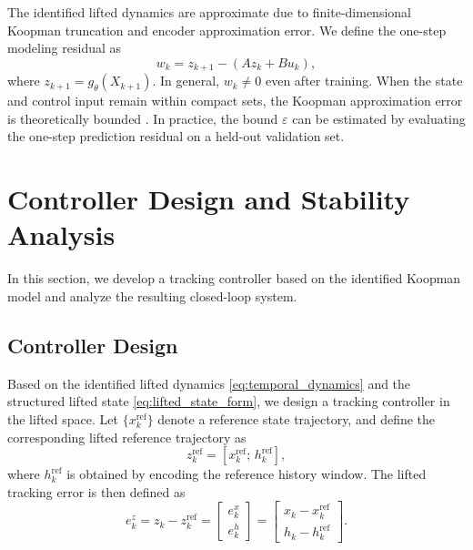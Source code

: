 \documentclass[journal]{IEEEtran}
\begin{document}
The identified lifted dynamics are approximate due to finite-dimensional Koopman truncation and encoder approximation error. We define the one-step modeling residual as
\begin{equation}
    w_k = z_{k+1} - (A z_k + B u_k),
    \label{eq:modeling_error}
\end{equation}
where $z_{k+1} = g_\theta(X_{k+1})$. In general, $w_k \neq 0$ even after training. When the state and control input remain within compact sets, the Koopman approximation error is theoretically bounded \cite{korda2018linear}. In practice, the bound $\varepsilon$ can be estimated by evaluating the one-step prediction residual on a held-out validation set.

\section{Controller Design and Stability Analysis}
\label{sec:control}

In this section, we develop a tracking controller based on the identified Koopman model and analyze the resulting closed-loop system.

\subsection{Controller Design}
\label{subsec:controller_design}

Based on the identified lifted dynamics \eqref{eq:temporal_dynamics} and the structured lifted state \eqref{eq:lifted_state_form}, we design a tracking controller in the lifted space. Let $\{x_k^{\mathrm{ref}}\}$ denote a reference state trajectory, and define the corresponding lifted reference trajectory as
\begin{equation}
    z_k^{\mathrm{ref}} = [x_k^{\mathrm{ref}};\,h_k^{\mathrm{ref}}],
    \label{eq:lifted_reference}
\end{equation}
where $h_k^{\mathrm{ref}}$ is obtained by encoding the reference history window. The lifted tracking error is then defined as
\begin{equation}
    e_k^z = z_k - z_k^{\mathrm{ref}}
    =
    \begin{bmatrix}
        e_k^x \\ e_k^h
    \end{bmatrix}
    =
    \begin{bmatrix}
        x_k - x_k^{\mathrm{ref}} \\
        h_k - h_k^{\mathrm{ref}}
    \end{bmatrix}.
    \label{eq:structured_error}
\end{equation}
\end{document}
